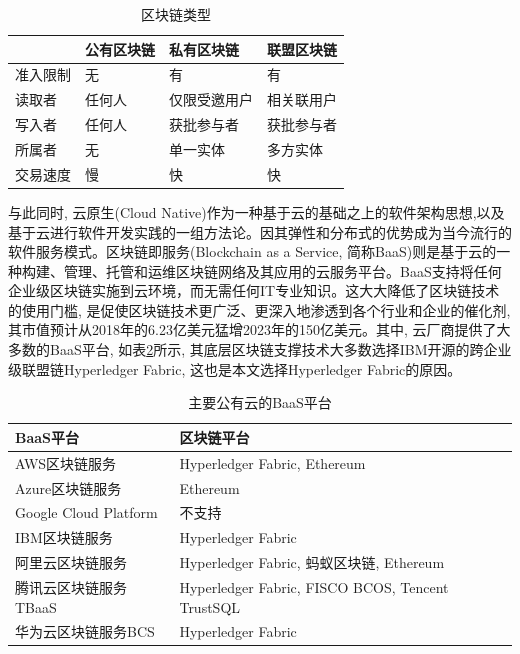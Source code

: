 {\footnotesize
\begin{longtable}[h]{m{70pt}|m{70pt}|m{70pt}|m{70pt}}
    \caption[区块链类型]{区块链类型} \label{blockchain_type} \\
        \hline  
        &公有区块链&私有区块链&联盟区块链\\
        \hline
        准入限制&无&有&有\\
        \hline
        读取者&任何人&仅限受邀用户&相关联用户\\
        \hline
        写入者&任何人&获批参与者&获批参与者\\
        \hline
        所属者&无&单一实体&多方实体\\
        \hline
        交易速度&慢&快&快\\
        \hline
    \end{longtable}
}

与此同时, 云原生(Cloud Native)作为一种基于云的基础之上的软件架构思想,以及基于云进行软件开发实践的一组方法论。因其弹性和分布式的优势成为当今流行的软件服务模式。区块链即服务(Blockchain as a Service, 简称BaaS)则是基于云的一种构建、管理、托管和运维区块链网络及其应用的云服务平台\cite{onik2019performance}。BaaS支持将任何企业级区块链实施到云环境，而无需任何IT专业知识。这大大降低了区块链技术的使用门槛, 是促使区块链技术更广泛、更深入地渗透到各个行业和企业的催化剂, 其市值预计从2018年的6.23亿美元猛增2023年的150亿美元\footnotemark[1]。其中, 云厂商提供了大多数的BaaS平台\cite{KuernetesbasedFabricChaincodeManagementAndHihgAvailabilityTechnology}, 如表\ref{major_BaaS_platforms}所示, 其底层区块链支撑技术大多数选择IBM开源的跨企业级联盟链Hyperledger Fabric, 这也是本文选择Hyperledger Fabric的原因。

{\footnotesize
\begin{longtable}[h]{m{150pt}|m{200pt}}
    \caption[主要公有云的BaaS平台]{主要公有云的BaaS平台} \label{major_BaaS_platforms} \\
        \hline  
        BaaS平台&区块链平台\\
        \hline
        AWS区块链服务&Hyperledger Fabric, Ethereum\\
        \hline
        Azure区块链服务&Ethereum\\
        \hline
        Google Cloud Platform&不支持\\
        \hline
        IBM区块链服务&Hyperledger Fabric\\
        \hline
        阿里云区块链服务&Hyperledger Fabric, 蚂蚁区块链, Ethereum\\
        \hline
        腾讯云区块链服务TBaaS&Hyperledger Fabric, FISCO BCOS, Tencent TrustSQL\\
        \hline
        华为云区块链服务BCS&Hyperledger Fabric\\
        \hline
    \end{longtable}
}

